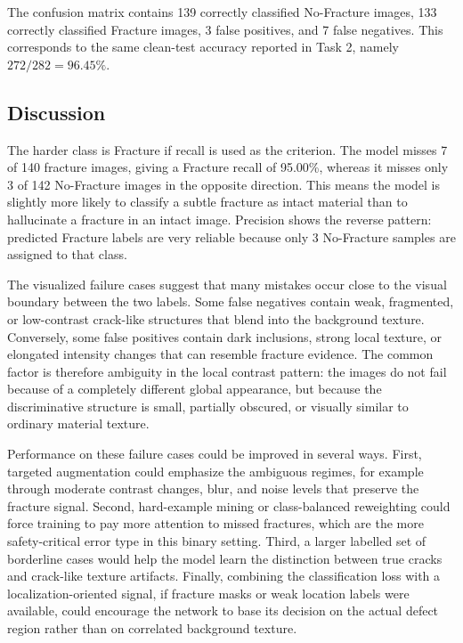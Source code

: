 \documentclass[11pt]{article}
\begin{document}
The confusion matrix contains 139 correctly classified No-Fracture images, 133 correctly classified Fracture images, 3 false positives, and 7 false negatives. This corresponds to the same clean-test accuracy reported in Task 2, namely $272/282=96.45\%$.

\subsection{Discussion}

The harder class is Fracture if recall is used as the criterion. The model misses 7 of 140 fracture images, giving a Fracture recall of 95.00\%, whereas it misses only 3 of 142 No-Fracture images in the opposite direction. This means the model is slightly more likely to classify a subtle fracture as intact material than to hallucinate a fracture in an intact image. Precision shows the reverse pattern: predicted Fracture labels are very reliable because only 3 No-Fracture samples are assigned to that class.

The visualized failure cases suggest that many mistakes occur close to the visual boundary between the two labels. Some false negatives contain weak, fragmented, or low-contrast crack-like structures that blend into the background texture. Conversely, some false positives contain dark inclusions, strong local texture, or elongated intensity changes that can resemble fracture evidence. The common factor is therefore ambiguity in the local contrast pattern: the images do not fail because of a completely different global appearance, but because the discriminative structure is small, partially obscured, or visually similar to ordinary material texture.

Performance on these failure cases could be improved in several ways. First, targeted augmentation could emphasize the ambiguous regimes, for example through moderate contrast changes, blur, and noise levels that preserve the fracture signal. Second, hard-example mining or class-balanced reweighting could force training to pay more attention to missed fractures, which are the more safety-critical error type in this binary setting. Third, a larger labelled set of borderline cases would help the model learn the distinction between true cracks and crack-like texture artifacts. Finally, combining the classification loss with a localization-oriented signal, if fracture masks or weak location labels were available, could encourage the network to base its decision on the actual defect region rather than on correlated background texture.
\end{document}
